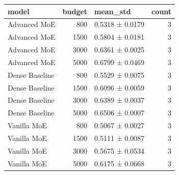 \begin{tabular}{lrlr}
\toprule
model & budget & mean\_std & count \\
\midrule
Advanced MoE & 800 & 0.5318 ± 0.0179 & 3 \\
Advanced MoE & 1500 & 0.5804 ± 0.0181 & 3 \\
Advanced MoE & 3000 & 0.6361 ± 0.0025 & 3 \\
Advanced MoE & 5000 & 0.6799 ± 0.0469 & 3 \\
Dense Baseline & 800 & 0.5529 ± 0.0075 & 3 \\
Dense Baseline & 1500 & 0.6096 ± 0.0059 & 3 \\
Dense Baseline & 3000 & 0.6389 ± 0.0037 & 3 \\
Dense Baseline & 5000 & 0.6506 ± 0.0007 & 3 \\
Vanilla MoE & 800 & 0.5067 ± 0.0027 & 3 \\
Vanilla MoE & 1500 & 0.5111 ± 0.0087 & 3 \\
Vanilla MoE & 3000 & 0.5675 ± 0.0534 & 3 \\
Vanilla MoE & 5000 & 0.6175 ± 0.0668 & 3 \\
\bottomrule
\end{tabular}
